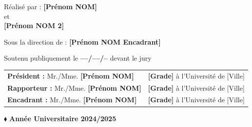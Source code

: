 \begin{titlepage}
\vspace{0.4cm}

\begin{center}
  {\small Réalisé par : \textbf{[Prénom NOM]}}\\[0.15cm]
  {\small et}\\[0.15cm]
  {\small \textbf{[Prénom NOM 2]}}
\end{center}

\vspace{0.25cm}

\begin{center}
  {\small Sous la direction de : \textbf{[Prénom NOM Encadrant]}}
\end{center}

\vspace{0.25cm}

\begin{center}
  {\small Soutenu publiquement le \textbf{---/---/--} devant le jury}
\end{center}

\vspace{0.35cm}

\noindent
\begin{tabular}{@{}ll@{}}
  \textbf{Président :} Mr./Mme. \textbf{[Prénom NOM]}  & \textbf{[Grade]} à l'Université de [Ville] \\[4pt]
  \textbf{Rapporteur :} Mr./Mme. \textbf{[Prénom NOM]} & \textbf{[Grade]} à l'Université de [Ville] \\[4pt]
  \textbf{Encadrant :} Mr./Mme. \textbf{[Prénom NOM]}  & \textbf{[Grade]} à l'Université de [Ville] \\
\end{tabular}

\vfill

\begin{center}
  $\blacklozenge$ \quad \textbf{Année Universitaire 2024/2025}
\end{center}

\end{titlepage}

